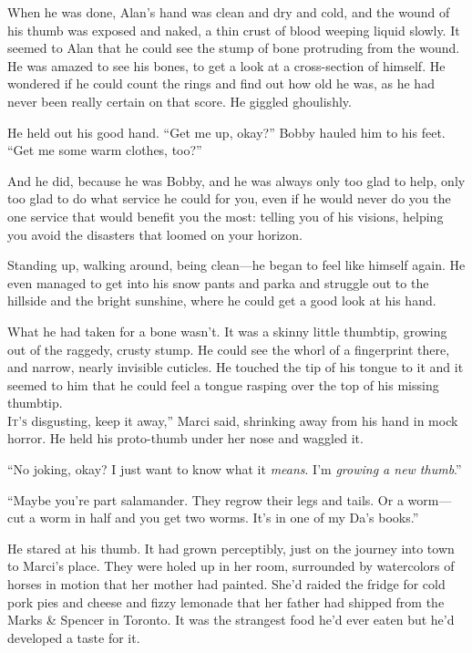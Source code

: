 When he was done, Alan's hand was clean and dry and cold, and the
wound of his thumb was exposed and naked, a thin crust of blood
weeping liquid slowly.  It seemed to Alan that he could see the stump
of bone protruding from the wound.  He was amazed to see his bones, to
get a look at a cross-section of himself.  He wondered if he could
count the rings and find out how old he was, as he had never been
really certain on that score.  He giggled ghoulishly.

He held out his good hand.  ``Get me up, okay?'' Bobby hauled him to
his feet.  ``Get me some warm clothes, too?''

And he did, because he was Bobby, and he was always only too glad to
help, only too glad to do what service he could for you, even if he
would never do you the one service that would benefit you the most: 
telling you of his visions, helping you avoid the disasters that
loomed on your horizon.

Standing up, walking around, being clean---he began to feel like
himself again.  He even managed to get into his snow pants and parka
and struggle out to the hillside and the bright sunshine, where he
could get a good look at his hand.

What he had taken for a bone wasn't.  It was a skinny little thumbtip,
growing out of the raggedy, crusty stump.  He could see the whorl of a
fingerprint there, and narrow, nearly invisible cuticles.  He touched
the tip of his tongue to it and it seemed to him that he could feel a
tongue rasping over the top of his missing thumbtip.
\\
\lettrine[lines=3, lhang=.5, nindent=0pt, findent=2pt]{I}{t's} disgusting, keep it away,'' Marci said, shrinking away from his
hand in mock horror.  He held his proto-thumb under her nose and
waggled it.

``No joking, okay?  I just want to know what it \textit{means}.  I'm
\textit{growing a new thumb}.''

``Maybe you're part salamander.  They regrow their legs and tails.  Or
a worm---cut a worm in half and you get two worms.  It's in one of my
Da's books.''

He stared at his thumb.  It had grown perceptibly, just on the journey
into town to Marci's place.  They were holed up in her room,
surrounded by watercolors of horses in motion that her mother had
painted.  She'd raided the fridge for cold pork pies and cheese and
fizzy lemonade that her father had shipped from the Marks \&
Spencer in Toronto.  It was the strangest food he'd ever eaten but
he'd developed a taste for it.

